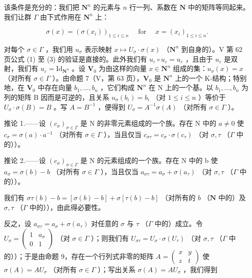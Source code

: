 该条件是充分的：我们把 \(\mathbf{N}^n\) 的元素与 \(n\) 行一列、系数在 \(\mathbf{N}\) 中的矩阵等同起来。我们让群 \(\Gamma\) 由下式作用在 \(\mathbf{N}^n\) 上：

\[
\sigma (x) = \left(\sigma \left(x _ {i}\right)\right) _ {1 \leqslant i \leqslant n} \quad \text { for } \quad x = \left(x _ {i}\right) _ {1 \leqslant i \leqslant n}.
\]

对每个 \(\sigma \in \Gamma\) ，我们用 \(u_{\sigma}\) 表示映射 \(x \mapsto U_{\sigma} \cdot \sigma(x)\) （\(\mathbf{N}^n\) 到自身的）。V 第 62 页公式 (1) 至 (3) 的验证是直接的。此外我们有 \(u_{\varepsilon} \circ u_{\varepsilon} = u_{\varepsilon}\) ，且由于 \(u_{\varepsilon}\) 是双射，我们有 \(u_{\varepsilon} = \mathrm{Id}_{\mathbf{N}^n}\) 。设 \(\mathbf{V}_0\) 为由这样的向量 \(x \in \mathbf{N}^n\) 组成的集：\(u_{\sigma}(x) = x\) （对所有 \(\sigma \in \Gamma\) ）。由命题 7（V，第 63 页），\(\mathbf{V}_0\) 是 \(\mathbf{N}^n\) 上的一个 K-结构；特别地，在 \(\mathbf{V}_0\) 中存在向量 \(b_1, \ldots, b_n\) ，它们构成 \(\mathbf{N}^n\) 在 N 上的一个基。以 \(b_1, \ldots, b_n\) 为列的矩阵 B 因而是可逆的，且关系 \(u_{\sigma}(b_i) = b_i\) （对 \(1 \leqslant i \leqslant n\) ）等价于 \(U_{\sigma} \cdot \sigma(B) = B\) 。写 \(A = B^{-1}\) ，便得到 \(U_{\sigma} = A^{-1}\sigma(A)\) （对所有 \(\sigma \in \Gamma\) ）。

推论 1.——设 \((c_{\sigma})_{\sigma \in \Gamma}\) 是 N 的非零元素组成的一个族。存在 N 中的 \(a \neq 0\) 使 \(c_{\sigma} = \sigma(a) \cdot a^{-1}\) （对所有 \(\sigma \in \Gamma\) ），当且仅当 \(c_{\sigma\tau} = c_{\sigma} \cdot \sigma(c_{\tau})\) （对 \(\sigma, \tau\) （\(\Gamma\) 中的））。

推论 2.——设 \((c_{\sigma})_{\sigma \in \Gamma}\) 是 N 的元素组成的一个族。存在 N 中的 b 使 \(a_{\sigma} = \sigma(b) - b\) （对所有 \(\sigma \in \Gamma\) ），当且仅当 \(a_{\sigma\tau} = a_{\sigma} + \sigma(a_{\tau})\) （对 \(\sigma, \tau\) （\(\Gamma\) 中的））。

我们有 \(\sigma \tau(b) - b = [\sigma(b) - b] + \sigma[\tau(b) - b]\) （对所有的 \(b\) （\(\mathbf{N}\) 中的）及 \(\sigma, \tau\) （\(\Gamma\) 中的）），由此得必要性。

反之，设 \(a_{\sigma \tau} = a_{\sigma} + \sigma(a_{\tau})\) 对任意的 \(\sigma\) 与 \(\tau\) （\(\Gamma\) 中的）成立。令 \(U_{\sigma} = \begin{pmatrix} 1 & a_{\sigma} \\ 0 & 1 \end{pmatrix}\) （对 \(\sigma \in \Gamma\) ）；则我们有 \(U_{\sigma \tau} = U_{\sigma} \cdot \sigma(U_{\tau})\) （对 \(\sigma, \tau\) （\(\Gamma\) 中的））；于是由命题 9，存在一个行列式非零的矩阵 \(A = \begin{pmatrix} x & y \\ z & t \end{pmatrix}\) 使 \(\sigma(A) = AU_{\sigma}\) （对所有 \(\sigma \in \Gamma\) ）；写出关系 \(\sigma(A) = AU_{\sigma}\) ，我们得到

